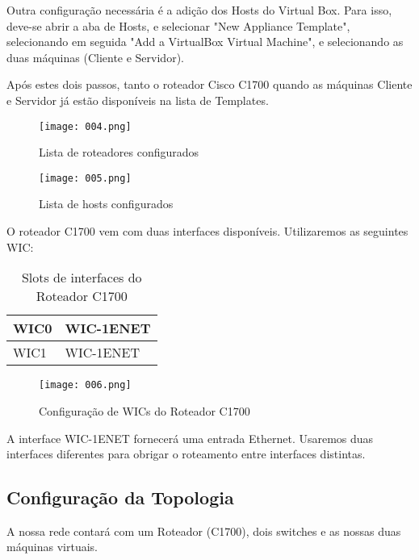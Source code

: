 Outra configuração necessária é a adição dos Hosts do Virtual Box. Para isso, deve-se abrir a aba de Hosts, e selecionar "New Appliance Template", selecionando em seguida "Add a VirtualBox Virtual Machine", e selecionando as duas máquinas (Cliente e Servidor).

Após estes dois passos, tanto o roteador Cisco C1700 quando as máquinas Cliente e Servidor já estão disponíveis na lista de Templates.

\begin{figure}[H]
\centering
\texttt{[image: 004.png]}
\caption{Lista de roteadores configurados}
\label{Rotulo}
\end{figure}

\begin{figure}[H]
\centering
\texttt{[image: 005.png]}
\caption{Lista de hosts configurados}
\label{Rotulo}
\end{figure}

O roteador C1700 vem com duas interfaces disponíveis. Utilizaremos as seguintes WIC:

\begin{table}[H]
\centering
\label{my-label}
\begin{tabular}{|l|l|}
\hline
WIC0 & WIC-1ENET \\ \hline
WIC1 & WIC-1ENET \\ \hline
\end{tabular}
\caption{Slots de interfaces do Roteador C1700}
\end{table}

\begin{figure}[H]
\centering
\texttt{[image: 006.png]}
\caption{Configuração de WICs do Roteador C1700}
\label{Rotulo}
\end{figure}


A interface WIC-1ENET fornecerá uma entrada Ethernet. Usaremos duas interfaces diferentes para obrigar o roteamento entre interfaces distintas.

\subsection{Configuração da Topologia}

A nossa rede contará com um Roteador (C1700), dois switches e as nossas duas máquinas virtuais.

